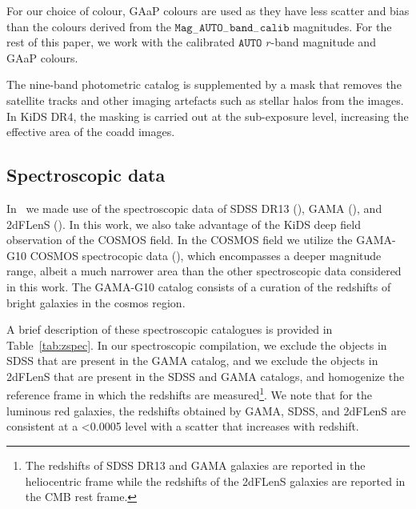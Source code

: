 \documentclass{aa}
\numberwithin{equation}{section}
\begin{document}
For our choice of colour, GAaP colours are used as they have less scatter and bias than the colours derived from the $\mathtt{Mag}_{-}\mathtt{AUTO}_{-}\mathtt{band}_{-}\mathtt{calib}$ magnitudes. For the rest of this paper, we work with the calibrated $\mathtt{AUTO}$ $r$-band magnitude and GAaP colours. 

The nine-band photometric catalog is supplemented by a mask that removes the satellite tracks and other imaging artefacts such as stellar halos from the images. In KiDS DR4, the masking is carried out at the sub-exposure level, increasing the effective area of the coadd images. 

\subsection{Spectroscopic data}\label{sec:spec}

In~\citet{vakili2019} we made use of the spectroscopic data of SDSS DR13 (\citealt{sdss_dr13}), GAMA (\citealt{driver2011}), and 2dFLenS (\citealt{blake2016}). In this work, we also take advantage of the KiDS deep field observation of the COSMOS field. In the COSMOS field we utilize the GAMA-G10 COSMOS spectrocopic data (\citealt{davis2017}), which encompasses a deeper magnitude range, albeit a much narrower area than the other spectroscopic data considered in this work. The GAMA-G10 catalog consists of a curation of the redshifts of bright galaxies in the cosmos region. 

A brief description of these spectroscopic catalogues is provided in Table~\ref{tab:zspec}. In our spectroscopic compilation, we exclude the objects in SDSS that are present in the GAMA catalog, and we exclude the objects in 2dFLenS that are present in the SDSS and GAMA catalogs, and homogenize the reference frame in which the redshifts are measured\footnote{The redshifts of SDSS DR13 and GAMA galaxies are reported in the heliocentric frame while the redshifts of the 2dFLenS galaxies are reported in the CMB rest frame.}. We note that for the luminous red galaxies, the redshifts obtained by GAMA, SDSS, and 2dFLenS are consistent at a <0.0005 level with a scatter that increases with redshift. 
\end{document}
